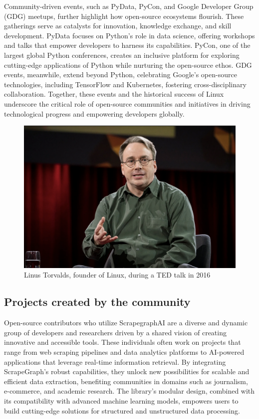 Community-driven events, such as PyData, PyCon, and Google Developer Group (GDG) meetups, further highlight how open-source ecosystems flourish. These gatherings serve as catalysts for innovation, knowledge exchange, and skill development. PyData focuses on Python’s role in data science, offering workshops and talks that empower developers to harness its capabilities. PyCon, one of the largest global Python conferences, creates an inclusive platform for exploring cutting-edge applications of Python while nurturing the open-source ethos. GDG events, meanwhile, extend beyond Python, celebrating Google’s open-source technologies, including TensorFlow and Kubernetes, fostering cross-disciplinary collaboration. Together, these events and the historical success of Linux underscore the critical role of open-source communities and initiatives in driving technological progress and empowering developers globally.

\begin{figure}[h!]
    \centering
    \includegraphics[width=0.5\linewidth]{Assets/torvalds.png}
    \caption{Linus Torvalds, founder of Linux, during a TED talk in 2016}
    \label{fig:enter-label}
\end{figure}

\subsection{Projects created by the community}
Open-source contributors who utilize ScrapegraphAI are a diverse and dynamic group of developers and researchers driven by a shared vision of creating innovative and accessible tools. These individuals often work on projects that range from web scraping pipelines and data analytics platforms to AI-powered applications that leverage real-time information retrieval. By integrating ScrapeGraph's robust capabilities, they unlock new possibilities for scalable and efficient data extraction, benefiting communities in domains such as journalism, e-commerce, and academic research. The library’s modular design, combined with its compatibility with advanced machine learning models, empowers users to build cutting-edge solutions for structured and unstructured data processing.

